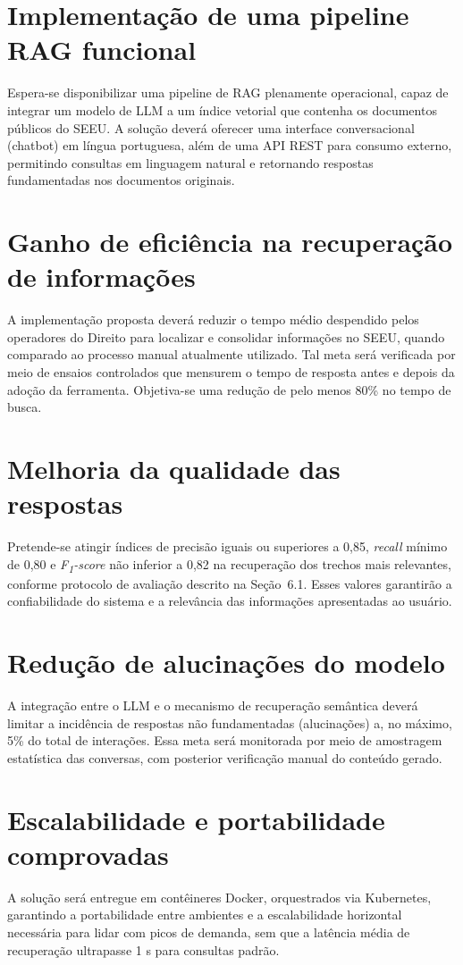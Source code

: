 \begin{description}
\section{Implementação de uma pipeline RAG funcional}
Espera-se disponibilizar uma pipeline de RAG plenamente operacional, capaz de integrar um modelo de LLM a um índice vetorial que contenha os documentos públicos do SEEU. A solução deverá oferecer uma interface conversacional (chatbot) em língua portuguesa, além de uma API REST para consumo externo, permitindo consultas em linguagem natural e retornando respostas fundamentadas nos documentos originais.

\section{Ganho de eficiência na recuperação de informações}
A implementação proposta deverá reduzir o tempo médio despendido pelos operadores do Direito para localizar e consolidar informações no SEEU, quando comparado ao processo manual atualmente utilizado. Tal meta será verificada por meio de ensaios controlados que mensurem o tempo de resposta antes e depois da adoção da ferramenta. Objetiva-se uma redução de pelo menos 80\% no tempo de busca.

\section{Melhoria da qualidade das respostas}
Pretende-se atingir índices de precisão iguais ou superiores a 0,85, \emph{recall} mínimo de 0,80 e \emph{F\textsubscript{1}-score} não inferior a 0,82 na recuperação dos trechos mais relevantes, conforme protocolo de avaliação descrito na Seção~6.1. Esses valores garantirão a confiabilidade do sistema e a relevância das informações apresentadas ao usuário.

\section{Redução de alucinações do modelo}
A integração entre o LLM e o mecanismo de recuperação semântica deverá limitar a incidência de respostas não fundamentadas (alucinações) a, no máximo, 5\% do total de interações. Essa meta será monitorada por meio de amostragem estatística das conversas, com posterior verificação manual do conteúdo gerado.

\section{Escalabilidade e portabilidade comprovadas}
A solução será entregue em contêineres Docker, orquestrados via Kubernetes, garantindo a portabilidade entre ambientes e a escalabilidade horizontal necessária para lidar com picos de demanda, sem que a latência média de recuperação ultrapasse 1 s para consultas padrão.


\end{description}
